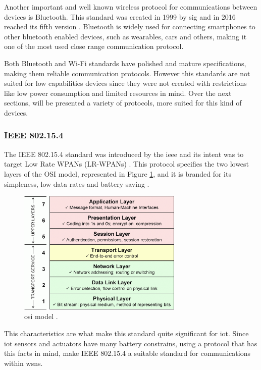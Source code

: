 Another important and well known wireless protocol for communications between devices is Bluetooth. This standard was created in 1999 by \acf{sig} and in 2016 reached its fifth version \cite{BluetoothSIG2016}. Bluetooth is widely used for connecting smartphones to other bluetooth enabled devices, such as wearables, cars and others, making it one of the most used close range communication protocol.

Both Bluetooth and Wi-Fi standards have polished and mature specifications, making them reliable communication protocols. However this standards are not suited for low capabilities devices since they were not created with restrictions like low power consumption and limited resources in mind. Over the next sections, will be presented a variety of protocols, more suited for this kind of devices.

\subsubsection{IEEE 802.15.4}

The IEEE 802.15.4 standard was introduced by the \acf{ieee} and its intent was to target Low Rate WPANs (LR-WPANs) \cite{Kemp2010}. This protocol specifies the two lowest layers of the OSI model, represented in Figure \ref{fig:osi}, and it is branded for its simpleness, low data rates and battery saving \cite{Devadiga2003}.

\begin{figure}[H]
	\centering
	\includegraphics[width=0.7\textwidth]{figures/osi.png}
	\caption{\acf{osi} model \cite{Zikrillah}.}
	\label{fig:osi}
\end{figure}

This characteristics are what make this standard quite significant for \ac{iot}. Since \ac{iot} sensors and actuators have many battery constrains, using a protocol that has this facts in mind, make IEEE 802.15.4 a suitable standard for communications within \ac{wsn}s.

